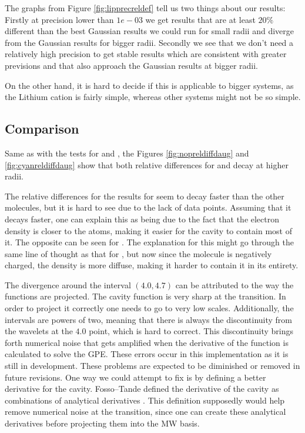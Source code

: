 \documentclass[../master_thesis.tex]{subfiles}
\begin{document}
The graphs from Figure \ref{fig:lipprecreldef} tell us two things about our results:
Firstly at precision lower than $1e-03$ we get results that are at least $20\%$ different
than the best Gaussian results we could run for small radii and diverge from the
Gaussian results for bigger radii. Secondly we see that we don't need a relatively
high precision to get stable results which are consistent with greater previsions and
that also approach the Gaussian results at bigger radii.

On the other hand, it is hard to decide if this is applicable to bigger systems,
as the Lithium cation is fairly simple, whereas
other systems might not be so simple.

\subsection{Comparison }
Same as with the tests for  and , the Figures \ref{fig:nopreldiffdaug}
and  \ref{fig:cyanreldiffdaug} show that both relative differences for 
and  decay at higher radii.

The relative differences for the results for   seem to decay faster
than the other molecules, but it
is hard to see due to the lack of data points. Assuming that it decays faster,
one can explain this as being due to the fact that the electron density is
closer to the atoms, making it easier for the cavity to contain most of it.
The opposite can be seen for . The explanation for this might go through
the same line of thought as that for , but now since the molecule is negatively
charged, the density is more diffuse, making it harder to contain it in its entirety.

The divergence around the interval $(4.0, 4.7)$ can be attributed to the way the
functions are projected. The cavity function is very sharp at the transition. In order to
project it correctly one needs to go to very low scales.
Additionally, the intervals are
powers of two, meaning that there is always the discontinuity from the wavelets at the
$4.0$ point, which is hard to correct. This discontinuity brings forth numerical
noise that gets amplified when the derivative of the function is calculated to solve the
\ac{GPE}.
These errors occur in this implementation as it is still in development. These
problems are expected to be diminished or removed in future revisions. One way we
could attempt to fix is by defining a better derivative for the cavity.
Fosso--Tande defined the derivative of the cavity as combinations of analytical
derivatives \cite{FossoTande:2013ka}. This definition supposedly would help
remove numerical noise at the transition, since one can create these analytical
derivatives before projecting them into the \ac{MW} basis.
\end{document}
